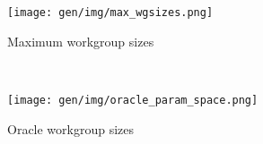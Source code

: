 \begin{subfigure}[t]{0.45\textwidth}
\centering
\texttt{[image: gen/img/max\_wgsizes.png]}
\vspace{-1.5em} %
\caption{Maximum workgroup sizes}
\label{fig:max-wgsizes}
\end{subfigure}
~%
\begin{subfigure}[t]{0.45\textwidth}
\centering
\texttt{[image: gen/img/oracle\_param\_space.png]}
\vspace{-1.5em} %
\caption{Oracle workgroup sizes}
\label{fig:oracle-wgsizes}
\end{subfigure}

